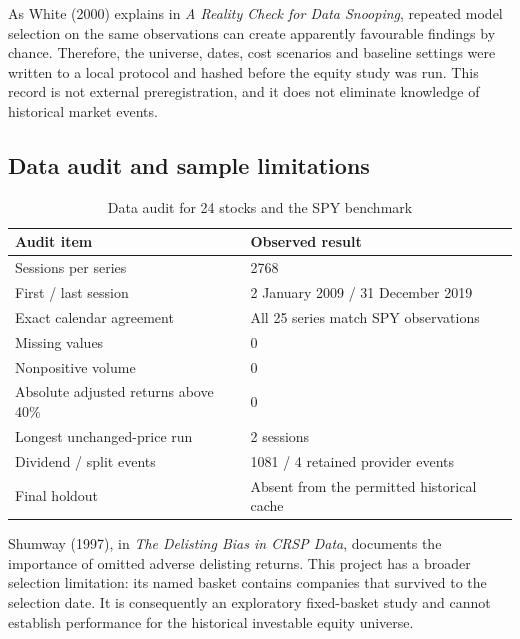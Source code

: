 \documentclass[12pt,a4paper,oneside]{article}
\begin{document}
As White (2000) explains in \textit{A Reality Check for Data Snooping}, repeated model selection on the same observations can create apparently favourable findings by chance. Therefore, the universe, dates, cost scenarios and baseline settings were written to a local protocol and hashed before the equity study was run. This record is not external preregistration, and it does not eliminate knowledge of historical market events.


\subsection{Data audit and sample limitations}

\begingroup
\setcounter{table}{4}
\fontsize{10}{12.5}\selectfont
\renewcommand{\arraystretch}{1.12}
\begin{table}[!htbp]
\centering
{}\fontsize{10}{12.5}\selectfont
\begin{tabular}{P{0.330000\dimexpr{}\tabcolsep\relax}P{0.670000\dimexpr{}\tabcolsep\relax}}
\toprule
{} \textbf{Audit item} & \textbf{Observed result} \\ \midrule
Sessions per series & 2768 \\
\midrule[0.2pt]
First / last session & 2 January 2009 / 31 December 2019 \\
\midrule[0.2pt]
Exact calendar agreement & All 25 series match SPY observations \\
\midrule[0.2pt]
Missing values & 0 \\
\midrule[0.2pt]
Nonpositive volume & 0 \\
\midrule[0.2pt]
Absolute adjusted returns above 40\% & 0 \\
\midrule[0.2pt]
Longest unchanged-price run & 2 sessions \\
\midrule[0.2pt]
Dividend / split events & 1081 / 4 retained provider events \\
\midrule[0.2pt]
Final holdout & Absent from the permitted historical cache \\
\bottomrule
\end{tabular}
\caption{Data audit for 24 stocks and the SPY benchmark}\label{tab:5}
\end{table}
\endgroup

Shumway (1997), in \textit{The Delisting Bias in CRSP Data}, documents the importance of omitted adverse delisting returns. This project has a broader selection limitation: its named basket contains companies that survived to the selection date. It is consequently an exploratory fixed-basket study and cannot establish performance for the historical investable equity universe.
\end{document}
